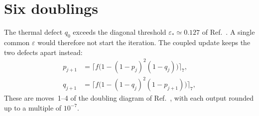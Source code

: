 \documentclass[aps,prl,reprint,amsmath,amssymb,nofootinbib,raggedbottom]{revtex4-2}
\begin{document}
\section{Six doublings}\label{app:c-doubling}
The thermal defect $q_0$ exceeds the diagonal threshold
$\varepsilon_*\simeq0.127$ of Ref.~\cite{scope}. A single common $\varepsilon$
would therefore not start the iteration. The coupled update keeps the two
defects apart instead:
\begin{equation}
 \begin{aligned}
 p_{j+1}&=\bigl\lceil f\bigl(1-(1-p_j)^2(1-q_j)\bigr)\bigr\rceil_7,\\
 q_{j+1}&=\bigl\lceil f\bigl(1-(1-q_j)^2(1-p_{j+1})\bigr)\bigr\rceil_7,
 \end{aligned}
 \label{eq:c-update}
\end{equation}
These are moves~1--4 of the doubling diagram of Ref.~\cite{main}, with each output
rounded up to a multiple of $10^{-7}$.
\end{document}
